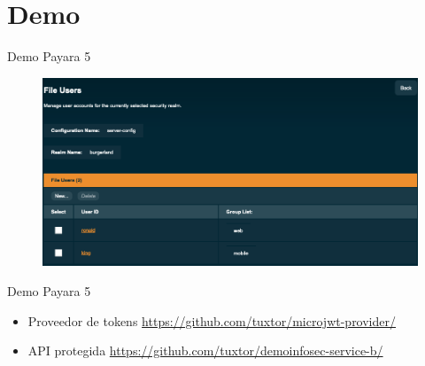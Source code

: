 \documentclass[aspectratio=169]{beamer}
\begin{document}
{
    \section{Demo}
}

\begin{frame}{Demo Payara 5}
    \begin{figure}
        \centering
        \includegraphics[width=0.9\linewidth]{Images/realms}
    \end{figure}
\end{frame}

\begin{frame}{Demo Payara 5}
    \begin{itemize}
        \item Proveedor de tokens \href{https://github.com/tuxtor/microjwt-provider/}{https://github.com/tuxtor/microjwt-provider/}
        \item API protegida \href{https://github.com/tuxtor/demoinfosec-service-b/}{https://github.com/tuxtor/demoinfosec-service-b/}
    \end{itemize}
\end{frame}
\end{document}
